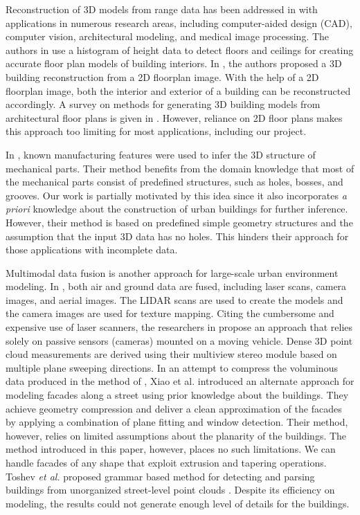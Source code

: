 \documentclass[10pt,twocolumn,letterpaper]{article}
\begin{document}
Reconstruction of 3D models from range data has been addressed in
\cite{RE_Fisher} with applications in numerous research areas,
including computer-aided design (CAD), computer vision, architectural modeling,
and medical image processing.
The authors in \cite{Okorn10} use a histogram of height data to detect floors
and ceilings for creating accurate floor plan models of building interiors.
In \cite{DP_OWYC}, the authors proposed a 3D building reconstruction from a
2D floorplan image.
With the help of a 2D floorplan image, both the interior and exterior of a
building can be reconstructed accordingly.
A survey on methods for generating 3D building models from architectural
floor plans is given in \cite{YIN09}.
However, reliance on 2D floor plans makes this approach too limiting for
most applications, including our project.

In \cite{RE_TOGSH}, known manufacturing features were used to infer the
3D structure of mechanical parts.
Their method benefits from the domain knowledge that most of the mechanical
parts consist of predefined structures, such as holes, bosses, and grooves.
Our work is partially motivated by this idea since it also incorporates
{\it a priori} knowledge about the construction of urban buildings for further
inference.
However, their method is based on predefined simple geometry structures and
the assumption that the input 3D data has no holes.
This hinders their approach for those applications with incomplete data.

Multimodal data fusion is another approach for large-scale urban
environment modeling.
In \cite{UM_Zakhor}, both air and ground data are fused, including
laser scans, camera images, and aerial images.
The LIDAR scans are used to create the models and the camera images are used
for texture mapping.
Citing the cumbersome and expensive use of laser scanners, the researchers
in \cite{AKBARZADEH06} propose an approach that relies solely on passive
sensors (cameras) mounted on a moving vehicle.
Dense 3D point cloud measurements are derived using their multiview stereo
module based on multiple plane sweeping directions.
In an attempt to compress the voluminous data produced in the method of
\cite{AKBARZADEH06}, Xiao et al. \cite{UM_XFTQ} introduced an alternate
approach for modeling facades along a street using prior knowledge about
the buildings.
They achieve geometry compression and deliver a clean approximation of the
facades by applying a combination of plane fitting and window detection.
Their method, however, relies on limited assumptions about the planarity of
the buildings.
The method introduced in this paper, however, places no such limitations.
We can handle facades of any shape that exploit extrusion and tapering operations.
Toshev {\it et al.} proposed grammar based method for detecting and parsing 
buildings from unorganized street-level point clouds \cite{RW_TMT} .
Despite its efficiency on modeling, the results could not generate 
enough level of details for the buildings. 
\end{document}
